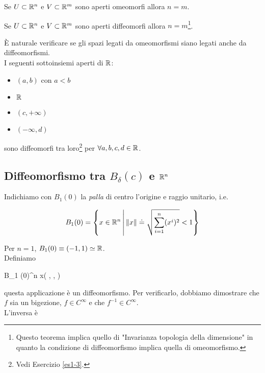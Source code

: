\begin{theorem}
	Se $ U \subset \mathbb{R}^{n} $ e $ V \subset \mathbb{R}^{m} $ sono aperti omeomorfi allora $ n = m $.
\end{theorem}

\begin{theorem}
	Se $ U \subset \mathbb{R}^{n} $ e $ V \subset \mathbb{R}^{m} $ sono aperti diffeomorfi allora $ n = m $\footnote{%
		Questo teorema implica quello di "Invarianza topologia della dimensione" in quanto la condizione di diffeomorfismo implica quella di omeomorfismo.}.
\end{theorem}

È naturale verificare se gli spazi legati da omeomorfismi siano legati anche da diffeomorfismi.\\
I seguenti sottoinsiemi aperti di $ \mathbb{R} $:

\begin{itemize}
	\item $ (a,b) $ con $ a < b $
	
	\item $ \mathbb{R} $
	
	\item $ (c, + \infty) $
	
	\item $ (- \infty, d) $
\end{itemize}

sono diffeomorfi tra loro\footnote{%
	Vedi Esercizio \ref{es1-3}.%
} per $ \forall a,b,c,d \in \mathbb{R} $.

\subsection{Diffeomorfismo tra $ B_{\delta} (c) $ e $ \mathbb{R}^{n} $}

Indichiamo con $ B_{1} (0) $ la \textit{palla} di centro l'origine e raggio unitario, i.e.

\begin{equation}
	B_{1} (0) = \left\{ x \in \mathbb{R}^{n} \, \middle| \, \norm{x} \doteq \sqrt{\sum_{i=1}^{n} (x^{i})^{2}} < 1 \right\}
\end{equation}

Per $ n=1 $, $ B_{1} (0) \equiv (-1,1) \simeq \mathbb{R} $.\\
Definiamo

	{B_{1} (0)}{\R^{n}}
	{x}{\left( , \cdots,  \right)}

questa applicazione è un diffeomorfismo. Per verificarlo, dobbiamo dimostrare che $ f $ sia un bigezione, $ f \in C^{\infty} $ e che $ f^{-1} \in C^{\infty} $.\\
L'inversa è

